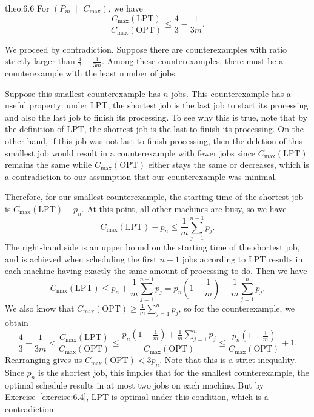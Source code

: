 \begin{theo}{theo:6.6}
    For $(P_m~\|~C_{\max})$, we have 
    \[ \frac{C_{\max}(\text{LPT})}{C_{\max}(\text{OPT})} \leq 
    \frac43 - \frac{1}{3m}. \] 
\end{theo}
\begin{pf}
    We proceed by contradiction. Suppose there are counterexamples with 
    ratio strictly larger than $\frac43 - \frac1{3m}$. Among these 
    counterexamples, there must be a counterexample with the least 
    number of jobs. 

    Suppose this smallest counterexample has $n$ jobs. This counterexample 
    has a useful property: under LPT, the shortest job is the last job 
    to start its processing and also the last job to finish its processing. 
    To see why this is true, note that by the definition of LPT, 
    the shortest job is the last to finish its processing. On the other hand, 
    if this job was not last to finish processing, then the deletion of 
    this smallest job would result in a counterexample with fewer jobs since 
    $C_{\max}(\text{LPT})$ remains the same while $C_{\max}(\text{OPT})$ 
    either stays the same or decreases, which is a contradiction to our 
    assumption that our counterexample was minimal. 

    Therefore, for our smallest counterexample, the starting time of the 
    shortest job is $C_{\max}(\text{LPT}) - p_n$. At this point, all other 
    machines are busy, so we have 
    \[ C_{\max}(\text{LPT}) - p_n \leq \frac1m \sum_{j=1}^{n-1} p_j. \] 
    The right-hand side is an upper bound on the starting time of the 
    shortest job, and is achieved when scheduling the first $n-1$ jobs 
    according to LPT results in each machine having exactly the same 
    amount of processing to do. Then we have 
    \[ C_{\max}(\text{LPT}) \leq p_n + \frac1m \sum_{j=1}^{n-1} p_j 
    = p_n\left(1 - \frac1m \right) + \frac1m \sum_{j=1}^n p_j. \] 
    We also know that $C_{\max}(\text{OPT}) \geq \frac1m \sum_{j=1}^n p_j$, 
    so for the counterexample, we obtain 
    \[ \frac43 - \frac1{3m} < \frac{C_{\max}(\text{LPT})}{C_{\max}(\text{OPT})} 
    \leq \frac{p_n(1 - \frac1m) + \frac1m \sum_{j=1}^n p_j}{C_{\max}(\text{OPT})} 
    \leq \frac{p_n(1 - \frac1m)}{C_{\max}(\text{OPT})} + 1. \] 
    Rearranging gives us $C_{\max}(\text{OPT}) < 3p_n$. Note that this 
    is a strict inequality. Since $p_n$ is the shortest job, this implies that 
    for the smallest counterexample, the optimal schedule results in at 
    most two jobs on each machine. But by Exercise~\ref{exercise:6.4}, 
    LPT is optimal under this condition, which is a contradiction. 
\end{pf}


